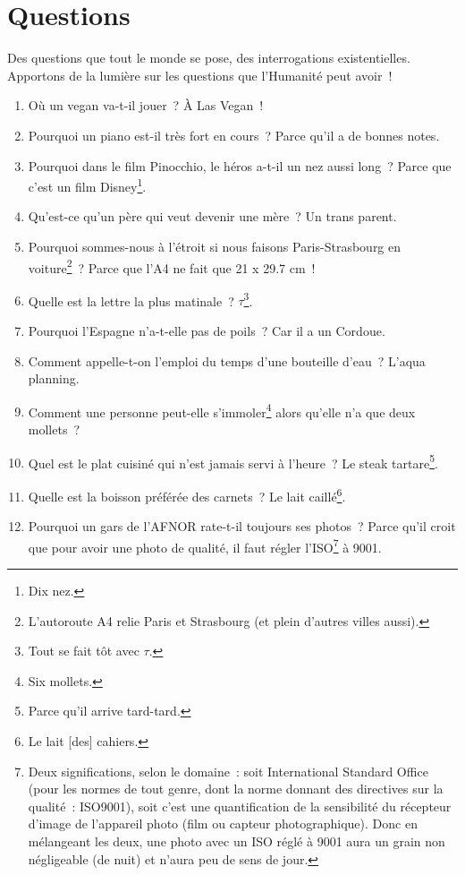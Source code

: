 \documentclass[10pt,a5paper,fullpage]{book}
\begin{document}
	\chapter{Questions}
	Des questions que tout le monde se pose, des interrogations existentielles.\\ Apportons de la lumière sur les questions que l'Humanité peut avoir~!
	\newpage
	\begin{enumerate}
		\item Où un vegan va-t-il jouer~? À Las Vegan~!
		\item Pourquoi un piano est-il très fort en cours~? Parce qu’il a de bonnes notes.
		\item Pourquoi dans le film Pinocchio, le héros a-t-il un nez aussi long~? Parce que c’est un film Disney\footnote{Dix nez.}.
		\item Qu’est-ce qu’un père qui veut devenir une mère~? Un trans parent.
		\item Pourquoi sommes-nous à l'étroit si nous faisons Paris-Strasbourg en voiture\footnote{L’autoroute A4 relie Paris et Strasbourg (et plein d’autres villes aussi).}~? Parce que l'A4 ne fait que 21 x 29.7 cm~!
		\item Quelle est la lettre la plus matinale~? $\tau$\footnote{Tout se fait tôt avec $\tau$.}.
		\item Pourquoi l’Espagne n’a-t-elle pas de poils~? Car il a un Cordoue.
		\item Comment appelle-t-on l’emploi du temps d’une bouteille d’eau~? L’aqua planning. 
		\item Comment une personne peut-elle s’immoler\footnote{Six mollets.} alors qu’elle n’a que deux mollets~?
		\item Quel est le plat cuisiné qui n’est jamais servi à l’heure~? Le steak tartare\footnote{Parce qu'il arrive tard-tard.}. 
		\item Quelle est la boisson préférée des carnets~? Le lait caillé\footnote{Le lait [des] cahiers.}.
		\item Pourquoi un gars de l'AFNOR rate-t-il toujours ses photos~? Parce qu'il croit que pour avoir une photo de qualité, il faut régler l'ISO\footnote{Deux significations, selon le domaine~: soit International Standard Office (pour les normes de tout genre, dont la norme donnant des directives sur la qualité~: ISO9001), soit c'est une quantification de la sensibilité du récepteur d'image de l'appareil photo (film ou capteur photographique). Donc en mélangeant les deux, une photo avec un ISO réglé à 9001 aura un grain non négligeable (de nuit) et n'aura peu de sens de jour.} à 9001. 

\end{enumerate}
\end{document}
